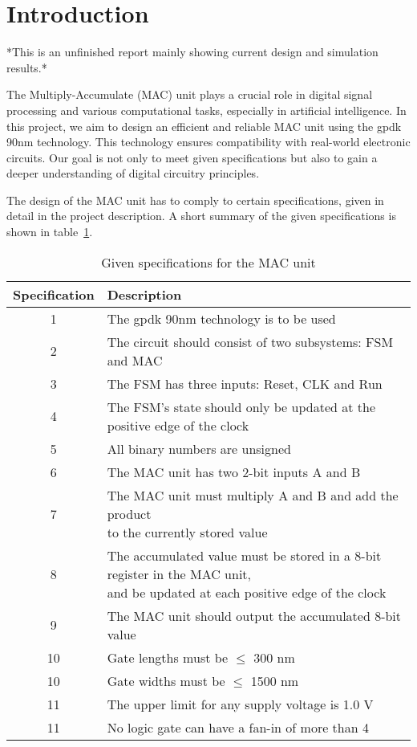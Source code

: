\section{Introduction}
\label{sec:introduction}

*This is an unfinished report mainly showing current design and simulation results.*

The Multiply-Accumulate (MAC) unit plays a crucial role in digital signal processing and various computational tasks, especially in artificial intelligence. In this project, we aim to design an efficient and reliable MAC unit using the gpdk 90nm technology. This technology ensures compatibility with real-world electronic circuits. Our goal is not only to meet given specifications but also to gain a deeper understanding of digital circuitry principles. 

The design of the MAC unit has to comply to certain specifications, given in detail in the project description\cite{project_description}. A short summary of the given specifications is shown in table~\ref{tab:specifications}.

\begin{table}[H]
\caption{Given specifications for the MAC unit}
\label{tab:specifications}
\centering
\begin{tabular}{|c|l|}
\hline
\rowcolor[HTML]{C0C0C0} 
 Specification & Description \\ \hline
 1 & The gpdk 90nm technology is to be used \\ \hline
 2 & The circuit should consist of two subsystems: FSM and MAC \\ \hline
 3 & The FSM has three inputs: Reset, CLK and Run  \\ \hline
 4 & The FSM’s state should only be updated at the positive edge of the clock \\ \hline
 5 & All binary numbers are unsigned \\ \hline
 6 & The MAC unit has two 2-bit inputs A and B \\ \hline
 7 & \makecell[l]{The MAC unit must multiply A and B and add the product\\ to the currently stored value}  \\ \hline
 8 & \makecell[l]{The accumulated value must be stored in a 8-bit register in the MAC unit,\\ and be updated at each positive edge of the clock} \\ \hline
 9 & The MAC unit should output the accumulated 8-bit value \\ \hline
 10 & Gate lengths must be $\le$ 300 nm \\ \hline
 10 & Gate widths must be $\le$ 1500 nm \\ \hline
 11 & The upper limit for any supply voltage is 1.0 V \\ \hline
 11 & No logic gate can have a fan-in of more than 4 \\ \hline
\end{tabular}
\end{table}

